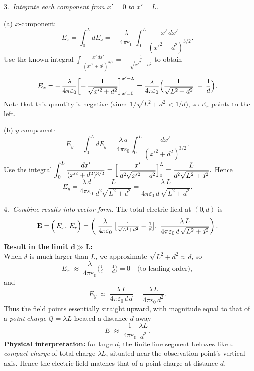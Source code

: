 \documentclass{article}
\begin{document}
3.\ 
\textit{Integrate each component from $x'=0$ to $x'=L$.}

\medskip
\noindent
\underline{(a) $x$-component:}
\[
E_x
= \int_0^L dE_x
= -\,\frac{\lambda}{4\pi\varepsilon_0}\,\int_0^L 
\frac{x'\,dx'}{(x'^2 + d^2)^{3/2}}.
\]
Use the known integral 
$\displaystyle
\int \frac{x'\,dx'}{(x'^2 + a^2)^{3/2}}
= -\,\frac{1}{\sqrt{x'^2 + a^2}}
$
to obtain
\[
E_x
= -\,\frac{\lambda}{4\pi\varepsilon_0}
\biggl[
-\,\frac{1}{\sqrt{x'^2 + d^2}}
\biggr]_{x'=0}^{x'=L}
= \frac{\lambda}{4\pi\varepsilon_0}
\Bigl(
\frac{1}{\sqrt{L^2 + d^2}} \;-\; \frac{1}{d}
\Bigr).
\]
Note that this quantity is negative (since $1/\sqrt{L^2 + d^2}<1/d$), so $E_x$ points to the left.

\medskip
\noindent
\underline{(b) $y$-component:}
\[
E_y
= \int_0^L dE_y
= \frac{\lambda\,d}{4\pi\varepsilon_0} \int_0^L 
\frac{dx'}{(x'^2 + d^2)^{3/2}}.
\]
Use the integral 
$\displaystyle
\int_0^L \frac{dx'}{(x'^2 + d^2)^{3/2}}
= \Bigl[\,
\frac{x'}{d^2\sqrt{x'^2 + d^2}}\Bigr]_0^L
= \frac{L}{d^2\sqrt{L^2 + d^2}}.
$
Hence
\[
E_y
= \frac{\lambda\,d}{4\pi\varepsilon_0}
\,\frac{L}{d^2\sqrt{L^2 + d^2}}
= \frac{\lambda\,L}{4\pi\varepsilon_0\,d\,\sqrt{L^2 + d^2}}.
\]

4.\ 
\textit{Combine results into vector form.} 
The total electric field at $(0,d)$ is
\[
\mathbf{E}
= \Bigl(\,
E_x,\,
E_y
\Bigr)
= \left(\;
\frac{\lambda}{4\pi\varepsilon_0}\,\bigl[\tfrac{1}{\sqrt{L^2 + d^2}} - \tfrac{1}{d}\bigr],\;
\frac{\lambda\,L}{4\pi\varepsilon_0\,d\,\sqrt{L^2 + d^2}}\right).
\]

\bigskip
\noindent
\textbf{Result in the limit $\boldsymbol{d \gg L}$:}\\[2pt]
When $d$ is much larger than $L$, we approximate $\sqrt{L^2 + d^2}\approx d$, so
\[
E_x 
\;\approx\;
\frac{\lambda}{4\pi\varepsilon_0}
\bigl(\tfrac{1}{d} - \tfrac{1}{d}\bigr)
= 0
\quad\text{(to leading order)},
\]
and 
\[
E_y
\;\approx\;
\frac{\lambda\,L}{4\pi\varepsilon_0\,d\,d}
=\frac{\lambda\,L}{4\pi\varepsilon_0\,d^{2}}.
\]
Thus the field points essentially straight upward, with magnitude equal to that of a \emph{point charge} $Q = \lambda L$ located a distance $d$ away:
\[
E \;\approx\;\frac{1}{4\pi\varepsilon_0}\,\frac{\lambda L}{d^2}.
\]
\textbf{Physical interpretation:} for large $d$, the finite line segment behaves like a \emph{compact charge} of total charge $\lambda L$, situated near the observation point's vertical axis. Hence the electric field matches that of a point charge at distance $d$.
\end{document}
